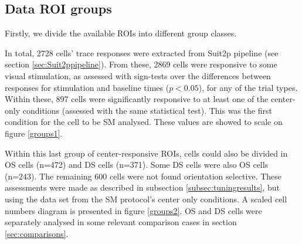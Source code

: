 \subsection{Data ROI groups}

Firstly, we divide the available ROIs into different group classes.

In total, 2728 cells' trace responses were extracted from Suit2p pipeline (see section \ref{sec:Suit2ppipeline}).  From these, 2869 cells were responsive to some visual stimulation, as assessed with sign-tests over the differences between responses for stimulation and baseline times ($p<0.05$), for any of the trial types. Within these, 897 cells were significantly responsive to at least one of the center-only conditions (assessed with the same statistical test). This was the first condition for the cell to be SM analysed. These values are showed to scale on figure \ref{groups1}.


Within this last group of center-responsive ROIs, cells could also be divided in OS cells (n=472) and DS cells (n=371). Some DS cells were also OS cells (n=243). The remaining 600 cells were not found orientation selective. These assessments were made as described in subsection \ref{subsec:tuningresults}, but using the data set from the SM protocol's center only conditions. A scaled cell numbers diagram is presented in figure \ref{groups2}.
OS and DS cells were separately analysed in some relevant comparison cases in section \ref{sec:comparisons}.
%

